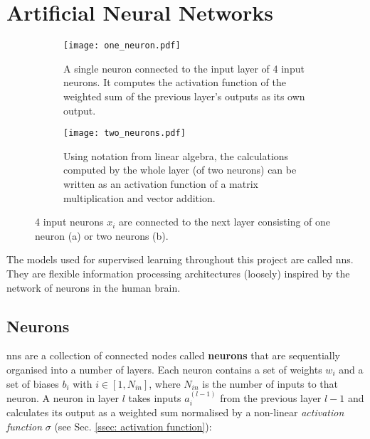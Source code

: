 \section{Artificial Neural Networks \label{sec: neural nets}}

    \begin{figure}[h]
        \centering
        \begin{subfigure}[b]{0.9\textwidth}
            \texttt{[image: one\_neuron.pdf]}
            \caption{A single \gls{neuron} connected to the input layer of 4 input \glspl{neuron}. It computes the activation function of the weighted sum of the previous layer's outputs as its own output. \label{subfig: neuron}}
        \end{subfigure}
        \hfill
        \begin{subfigure}[b]{0.9\textwidth}
            \texttt{[image: two\_neurons.pdf]}
            \caption{Using notation from linear algebra, the calculations computed by the whole layer (of two \glspl{neuron}) can be written as an activation function of a matrix multiplication and vector addition. \label{subfig: layer}}
        \end{subfigure}
        \caption{4 input \glspl{neuron} $x_i$ are connected to the next layer consisting of one \gls{neuron} (a) or two \glspl{neuron} (b).}
    \end{figure}



    The \glspl{model} used for supervised learning throughout this project are called \glspl{nn}. They are flexible information processing architectures (loosely) inspired by the network of \glspl{neuron} in the human brain.

    \subsection{Neurons}
        \Glspl{nn} are a collection of connected nodes called \textbf{\glspl{neuron}} that are sequentially organised into a number of layers. Each \gls{neuron} contains a set of weights $w_i$ and a set of biases $b_i$ with $i \in [1, N_{in}]$, where $N_{in}$ is the number of inputs to that \gls{neuron}. A \gls{neuron} in layer $l$ takes inputs $a_i^{(l-1)}$ from the previous layer $l-1$ and calculates its output as a weighted sum normalised by a non-linear \textit{activation function} $\sigma$ (see Sec. \ref{ssec: activation function}):

